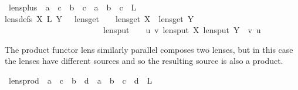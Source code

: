 \begin{isabellebody}
\isamarkupfalse%
\ lens{\isacharunderscore}plus\ {\isacharcolon}{\isacharcolon}\ {\isachardoublequoteopen}{\isacharparenleft}{\isacharprime}a\ {\isasymLongrightarrow}\ {\isacharprime}c{\isacharparenright}\ {\isasymRightarrow}\ {\isacharparenleft}{\isacharprime}b\ {\isasymLongrightarrow}\ {\isacharprime}c{\isacharparenright}\ {\isasymRightarrow}\ {\isacharprime}a\ {\isasymtimes}\ {\isacharprime}b\ {\isasymLongrightarrow}\ {\isacharprime}c{\isachardoublequoteclose}\ {\isacharparenleft}\ {\isachardoublequoteopen}{\isacharplus}\isactrlsub L{\isachardoublequoteclose}\ {}{}{\isacharparenright}\ \isanewline
{\isacharbrackleft}lens{\isacharunderscore}defs{\isacharbrackright}{\isacharcolon}\ {\isachardoublequoteopen}X\ {\isacharplus}\isactrlsub L\ Y\ {\isacharequal}\ {\isasymlparr}\ lens{\isacharunderscore}get\ {\isacharequal}\ {\isacharparenleft}{\isasymlambda}\ {\isasymsigma}{\isachardot}\ {\isacharparenleft}lens{\isacharunderscore}get\ X\ {\isasymsigma}{\isacharcomma}\ lens{\isacharunderscore}get\ Y\ {\isasymsigma}{\isacharparenright}{\isacharparenright}\isanewline
\ \ \ \ \ \ \ \ \ \ \ \ \ \ \ \ \ \ \ \ \ \ \ {\isacharcomma}\ lens{\isacharunderscore}put\ {\isacharequal}\ {\isacharparenleft}{\isasymlambda}\ {\isasymsigma}\ {\isacharparenleft}u{\isacharcomma}\ v{\isacharparenright}{\isachardot}\ lens{\isacharunderscore}put\ X\ {\isacharparenleft}lens{\isacharunderscore}put\ Y\ {\isasymsigma}\ v{\isacharparenright}\ u{\isacharparenright}\ {\isasymrparr}{\isachardoublequoteclose}%
\begin{isamarkuptext}%
The product functor lens similarly parallel composes two lenses, but in this case the lenses
  have different sources and so the resulting source is also a product.%
\end{isamarkuptext}\isamarkuptrue%
\isamarkupfalse%
\ lens{\isacharunderscore}prod\ {\isacharcolon}{\isacharcolon}\ {\isachardoublequoteopen}{\isacharparenleft}{\isacharprime}a\ {\isasymLongrightarrow}\ {\isacharprime}c{\isacharparenright}\ {\isasymRightarrow}\ {\isacharparenleft}{\isacharprime}b\ {\isasymLongrightarrow}\ {\isacharprime}d{\isacharparenright}\ {\isasymRightarrow}\ {\isacharparenleft}{\isacharprime}a\ {\isasymtimes}\ {\isacharprime}b\ {\isasymLongrightarrow}\ {\isacharprime}c\ {\isasymtimes}\ {\isacharprime}d{\isacharparenright}{\isachardoublequoteclose}\ {\isacharparenleft}\ {\isachardoublequoteopen}{\isasymtimes}\isactrlsub L{\isachardoublequoteclose}\ {}{}{\isacharparenright}\ \isanewline

\end{isabellebody}
